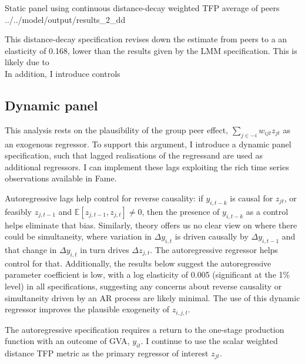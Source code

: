 \wraptable
    {Static panel using continuous distance-decay weighted TFP average of peers}
    {../../model/output/results_2_dd}
    {}

This distance-decay specification revises down the estimate from peers to a an elasticity of 0.168,
lower than the results given by the LMM specification. This is likely due to 
\\
In addition, I introduce controls 

\subsection{Dynamic panel}
\label{ss:model-dynamic-panel}

This analysis rests on the plausibility of the group peer effect,
$\sum_{j\in-i} w_{ijt}z_{jt}$ as an exogenous regressor.
To support this argument, I introduce a dynamic panel specification,
such that lagged realisations of the regressand are used as additional regressors.
I can implement these lags exploiting the rich time series observations available in Fame.
\par
Autoregressive lags help control for reverse causality: if $y_{i,t-k}$ is causal for $z_{jt}$,
or feasibly $z_{j,t-1}$ and $\mathbb E[z_{j,t-1}, z_{j,t}]\neq0$, then the presence of
$y_{i,t-k}$ as a control helps eliminate that bias.
Similarly, theory offers us no clear view on where there could be simultaneity,
where variation in $\Delta y_{i,t}$ is driven causally by $\Delta y_{i,t-1}$
and that change in $\Delta y_{i,t}$ in turn drives $\Delta z_{j,t}$.
The autoregressive regressor helps control for that.
Additionally, the results below suggest the autoregressive parameter coefficient is low,
with a log elasticity of 0.005 (significant at the 1\% level) in all specifications,
suggesting any concerns about reverse causality or simultaneity driven by an AR process
are likely minimal.
The use of this dynamic regressor improves the plausible exogeneity of $z_{i,j,t}$.
\par
The autoregressive specification requires a return to the one-stage production function
with an outcome of GVA, $y_{it}$. I continue to use the scalar weighted distance TFP metric
as the primary regressor of interest $z_{jt}$.

